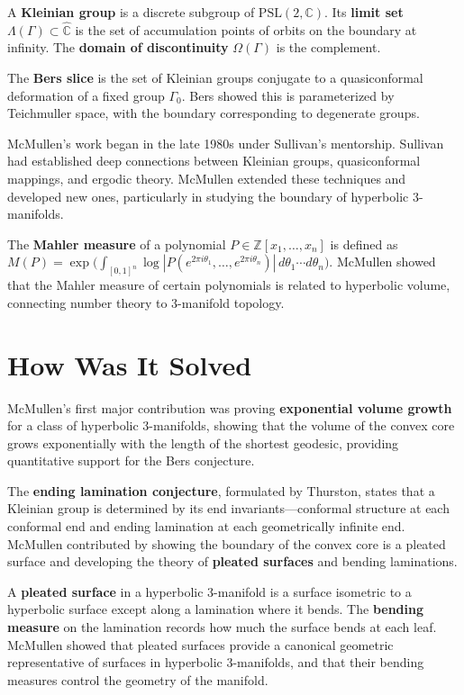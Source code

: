 A \textbf{Kleinian group} is a discrete subgroup of
$\mathrm{PSL}(2,\mathbb{C})$.  Its \textbf{limit set}
$\Lambda(\Gamma)\subset\widehat{\mathbb{C}}$ is the set of
accumulation points of orbits on the boundary at infinity.  The
\textbf{domain of discontinuity} $\Omega(\Gamma)$ is the
complement.

The \textbf{Bers slice} is the set of Kleinian groups conjugate to
a quasiconformal deformation of a fixed group $\Gamma_0$.  Bers
showed this is parameterized by Teichmuller space, with the
boundary corresponding to degenerate groups.

McMullen's work began in the late 1980s under Sullivan's
mentorship.  Sullivan had established deep connections between
Kleinian groups, quasiconformal mappings, and ergodic theory.
McMullen \cite{mcmullen1998} extended these techniques and developed new ones,
particularly in studying the boundary of hyperbolic 3-manifolds.

The \textbf{Mahler measure} of a polynomial
$P\in\mathbb{Z}[x_1,\dots,x_n]$ is defined as
$M(P) = \exp\bigl(\int_{[0,1]^n}\log|P(e^{2\pi i\theta_1},\dots,
e^{2\pi i\theta_n})|\,d\theta_1\cdots d\theta_n\bigr)$.
McMullen showed that the Mahler measure of certain polynomials is
related to hyperbolic volume, connecting number theory to
3-manifold topology.

\section{How Was It Solved}

McMullen's first major contribution was proving \textbf{exponential
volume growth} for a class of hyperbolic 3-manifolds, showing that
the volume of the convex core grows exponentially with the length
of the shortest geodesic, providing quantitative support for the
Bers conjecture.

The \textbf{ending lamination conjecture}, formulated by Thurston,
states that a Kleinian group is determined by its end
invariants---conformal structure at each conformal end and ending
lamination at each geometrically infinite end.  McMullen contributed
by showing the boundary of the convex core is a pleated surface and
developing the theory of \textbf{pleated surfaces} and bending
laminations.

A \textbf{pleated surface} in a hyperbolic 3-manifold is a surface
isometric to a hyperbolic surface except along a lamination where it
bends.  The \textbf{bending measure} on the lamination records how
much the surface bends at each leaf.  McMullen showed that pleated
surfaces provide a canonical geometric representative of surfaces in
hyperbolic 3-manifolds, and that their bending measures control the
geometry of the manifold.

